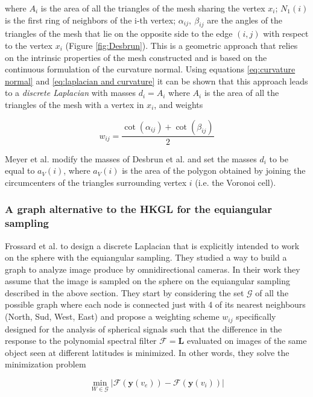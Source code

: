 where $A_i$ is the area of all the triangles of the mesh sharing the vertex $x_i$; $N_1(i)$ is the first ring of neighbors of the i-th vertex; $\alpha_{i j},\ \beta_{i j}$ are the angles of the triangles of the mesh that lie on the opposite side to the edge $(i,j)$ with respect to the vertex $x_i$ (Figure \ref{fig:Desbrun}). This is a geometric approach that relies on the intrinsic properties of the mesh constructed and is based on the continuous formulation of the curvature normal. Using equations \ref{eq:curvature normal} and \ref{eq:laplacian and curvature} it can be shown \cite{REUTER2009381} that this approach leads to a \textit{discrete Laplacian} with masses $d_i=A_i$ where $A_i$ is the area of all the triangles of the mesh with a vertex in $x_i$, and weights

$$w_{i j}=\frac{\cot \left(\alpha_{i j}\right)+\cot \left(\beta_{i j}\right)}{2}$$

Meyer et al. \cite{Meyer02discretedifferential-geometry} modify the masses of Desbrun et al. and set the masses $d_i$ to be equal to $a_{V}(i)$, where \(a_{V}(i)\) is the area of the polygon obtained by joining the circumcenters of the triangles surrounding vertex $i$ (i.e. the Voronoi cell).


\subsubsection{A graph alternative to the HKGL for the equiangular sampling}
Frossard et al. \cite{Frossard2017GraphBasedCO} to design a discrete Laplacian that is explicitly intended to work on the sphere with the equiangular sampling. They studied a way to build a graph to analyze image produce by omnidirectional cameras. In their work they assume that the image is sampled on the sphere on the equiangular sampling described in the above section. They start by considering the set $\mathcal G$ of all the possible graph where each node is connected just with 4 of its nearest neighbours (North, Sud, West, East) and propose a weighting scheme $w_{ij}$ specifically designed for the analysis of spherical signals such that the difference in the response to the polynomial spectral filter $\mathcal F = \mathbf L$ evaluated on images of the same object seen at different latitudes is minimized. In other words, they solve the minimization problem 

\begin{equation}\label{eq:minimization frossard}
	\min_{W\in\mathcal G} \left|\mathcal{F}\left(\mathbf{y}\left(v_{ e}\right)\right)-\mathcal{F}\left(\mathbf{y}\left(v_{ i}\right)\right)\right|
\end{equation}

